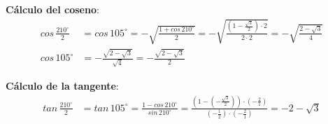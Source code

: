 \documentclass[11pt,letterpaper]{article}
\begin{document}
\begin{enumerate}
	\textbf{Cálculo del coseno}:
	\begin{align*}
		cos\,\frac{210^{\circ}}{2} &= cos\,105^{\circ} = -\sqrt{\frac{1 + cos\,210^{\circ}}{2}} = -\sqrt{\frac{(1-\frac{\sqrt{3}}{2}) \cdot 2}{2 \cdot 2}} = -\sqrt{\frac{2-\sqrt{3}}{4}}\\
		cos\,105^{\circ} &= -\frac{\sqrt{2-\sqrt{3}}}{\sqrt{4}} = -\frac{\sqrt{2-\sqrt{3}}}{2} 
	\end{align*}		

	\textbf{Cálculo de la tangente}:
	\begin{align*}
		tan\,\frac{210^{\circ}}{2} &= tan\,105^{\circ} = \frac{1-cos\,210^{\circ}}{sin\,210^{\circ}} = \frac{\left(1-(-\frac{\sqrt{3}}{2})\right) 
			\cdot (-\frac{2}{1})}{(-\frac{1}{2}) \cdot (-\frac{2}{1})} = -2-\sqrt{3}
	\end{align*}	

\end{enumerate}
\end{document}
